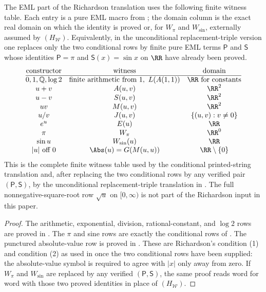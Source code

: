 \begin{lemma}
\label{lem:eml-core-witness-table}
The EML part of the Richardson translation uses the following finite witness
table.  Each entry is a pure EML macro from
;
the domain column is the exact real domain on which the identity is proved or,
for \(W_{\pi}\) and \(W_{\sin}\), externally assumed by \((H_{\mathcal W})\).
Equivalently, in the unconditional replacement-triple version one replaces only
the two conditional rows by finite pure EML terms \(\mathsf P\) and \(\mathsf S\)
whose identities \(\mathsf P=\pi\) and \(\mathsf S(x)=\sin x\) on \(\RR\) have
already been proved.
\[
\begin{array}{@{}c@{\quad}c@{\quad}c@{}}
\hbox{constructor} & \hbox{witness} & \hbox{domain}\\ \hline
0,1,\mathbb Q,\log2 &
\hbox{finite arithmetic from }1,\ L(A(1,1)) & \RR\hbox{ for constants}\\
u+v & A(u,v) & \RR^2\\
u-v & S(u,v) & \RR^2\\
uv & M(u,v) & \RR^2\\
u/v & J(u,v) & \{(u,v):v\ne0\}\\
e^u & E(u) & \RR\\
\pi & W_{\pi} & \RR^0\\
\sin u & W_{\sin}(u) & \RR\\
|u|\hbox{ off }0 & \Abs(u)=G(M(u,u)) & \RR\setminus\{0\}
\end{array}
\]
This is the complete finite witness table used by the conditional printed-string
translation and, after replacing the two conditional rows by any verified pair
\((\mathsf P,\mathsf S)\), by the unconditional replacement-triple translation in
.
The full nonnegative-square-root row \(\sqrt u\) on \([0,\infty)\) is not part of
the Richardson input in this paper.
\end{lemma}

\begin{proof}
The arithmetic, exponential, division, rational-constant, and \(\log2\) rows are
proved in .  The \(\pi\)
and sine rows are exactly the conditional rows of
.  The punctured absolute-value row is proved in
.  These are Richardson's condition (1)
and condition (2) as used in  once the two
conditional rows have been supplied: the absolute-value symbol is required to
agree with \(|x|\) only away from zero.  If \(W_{\pi}\) and \(W_{\sin}\) are
replaced by any verified \((\mathsf P,\mathsf S)\), the same proof reads word for
word with those two proved identities in place of \((H_{\mathcal W})\).
\end{proof}


